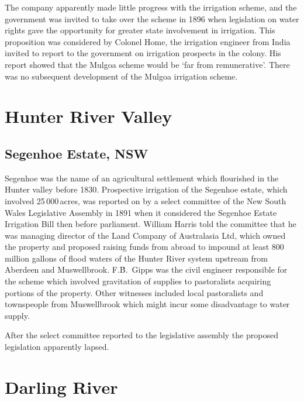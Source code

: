 The company apparently made little progress with the irrigation
sch\-eme, and the government was invited to take over the scheme in
1896 when legislation on water rights gave the opportunity for greater
state involvement in irrigation.  This proposition was considered by
Colonel Home,  the irrigation engineer from India
invited to report to the government on irrigation prospects in the
colony.  His report showed that the Mulgoa scheme would be `far from
remunerative'.  There was no subsequent development of the Mulgoa
irrigation scheme.

\section*{Hunter River Valley}

\subsection*{Segenhoe Estate, NSW}

Segenhoe was the name of an agricultural settlement which flourished
in the Hunter valley before 1830.  Prospective irrigation of the
Segenhoe estate, which involved 25\,000\,acres, was reported on by a
select committee of the New South Wales Legislative Assembly in 1891
when it considered the Segenhoe Estate Irrigation Bill then before
parliament.  William Harris told the committee that he was managing
director of the Land Company of Australasia Ltd, which owned the
property and proposed raising funds from abroad to impound at least
800 million gallons of flood waters of the Hunter River system
upstream from Aberdeen and Muswellbrook.  F.\.B.~Gipps  was the civil engineer responsible for the scheme which
involved gravitation of supplies to pastoralists acquiring portions of
the property.  Other witnesses included local pastoralists and
townspeople from Muswellbrook which might incur some disadvantage to
water supply.

After the select committee reported to the legislative assembly the
proposed legislation apparently lapsed.

\section*{Darling River}

